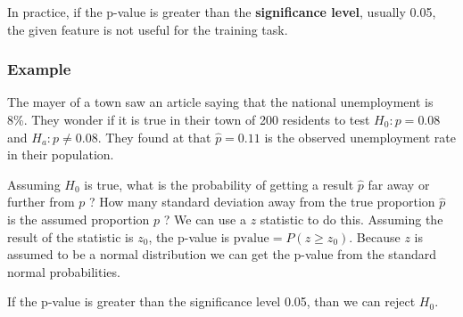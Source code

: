 \documentclass[12pt]{report}
\begin{document}
                In practice, if the p-value is greater than the \textbf{significance level}, usually 0.05, the given feature is not useful for the training task.
           \subsubsection{Example}
                The mayer of a town saw an article saying that the national unemployment is 8\%. They wonder if it is true in their town of 200 residents to test $H_0 : p = 0.08$ and $H_a : p \neq 0.08$. They found at that $\hat{p} = 0.11$ is the observed unemployment rate in their population.
                
                Assuming $H_0$ is true, what is the probability of getting a result $\hat{p}$ far away or further from $p$ ? How many standard deviation away from the true proportion $\hat{p}$ is the assumed proportion $p$ ? We can use a $z$ statistic to do this. Assuming the result of the statistic is $z_0$, the p-value is $\text{pvalue} = P(z \geq z_0)$. Because $z$ is assumed to be a  normal distribution we can get the p-value from the standard normal probabilities.
                
                If the p-value is greater than the significance level 0.05, than we can reject $H_0$.
        
\end{document}
